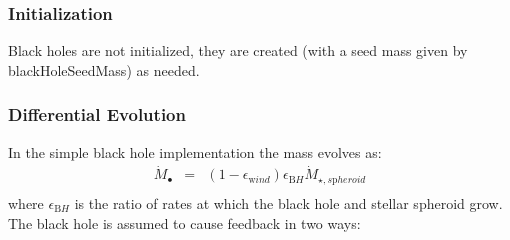 \subsubsection{Initialization}

Black holes are not initialized, they are created (with a seed mass given by {\normalfont \ttfamily blackHoleSeedMass}) as needed.

\subsubsection{Differential Evolution}

In the simple black hole implementation the mass evolves as:
\begin{eqnarray}
\dot{M}_\bullet &=& (1-\epsilon_{\mathrm wind}) \epsilon_{\mathrm BH} \dot{M}_{\star,s{\mathrm pheroid}} \\
\end{eqnarray}
where $\epsilon_{\mathrm BH}$ is the ratio of rates at which the black hole and stellar spheroid grow. The black hole is assumed to cause feedback in two ways:
